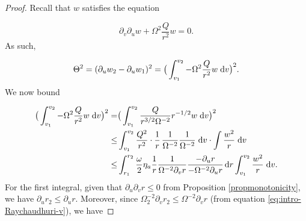 \documentclass{article}[11pt]
\newcommand{\hsp}{\hspace{.5mm}}
\newcommand{\dv}{\hspace{1mm}\text{d}v}
\numberwithin{equation}{section}
\begin{document}
\begin{proof}
Recall that $w$ satisfies the equation

\[  \partial_v \partial_u w +  \Omega^2\frac{Q}{r^2}w=0.   \]As such, 

\begin{align}
\Theta^2 =(\partial_u w_2 - \partial_u w_1)^2 = \big(\int_{v_1}^{v_2} - \Omega^2\frac{Q}{r^2}w \dv \big)^2.
\end{align}We now bound 

\begin{align}\notag 
\big(\int_{v_1}^{v_2} - \Omega^2\frac{Q}{r^2}w \dv \big)^2 =& \big( \int_{v_1}^{v_2} \frac{Q}{r^{3/2}\Omega^{-2}} r^{-1/2}w  \dv\big)^2 \\ \leq& \int_{v_1}^{v_2} \frac{Q^2}{r^2}\cdot \frac{1}{r}\hsp \frac{1}{\Omega^{-2}}\frac{1}{\Omega^{-2}} \dv \cdot \int \frac{w^2}{r}\dv \notag \\ \leq& \int_{r_1}^{r_2} \frac{\omega}{2}\eta_a \frac{1}{r}\frac{1}{\Omega^{-2} \partial_v r}\frac{-\partial_u r}{-\Omega^{-2}\partial_u r}\hsp \text{d}r \int_{v_1}^{v_2}\frac{w^2}{r} \dv. \label{thetafirst}
\end{align}For the first integral, given that $\partial_u \partial_v r\leq 0$ from Proposition \ref{propmonotonicity}, we have $\partial_u r_2 \leq \partial_u r$. Moreover, since $\Omega_2^{-2}\partial_v r_2 \leq \Omega^{-2}\partial_v r$ (from equation \eqref{eq:intro-Raychaudhuri-v}), we have 



\end{proof}
\end{document}
